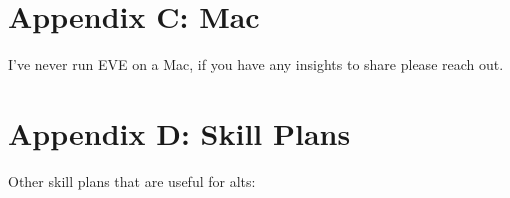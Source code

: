 \documentclass{article}
\begin{document}

\section*{Appendix C: Mac}
I've never run EVE on a Mac, if you have any insights to share please reach out.

\section*{Appendix D: Skill Plans}
Other skill plans that are useful for alts:
\end{document}
